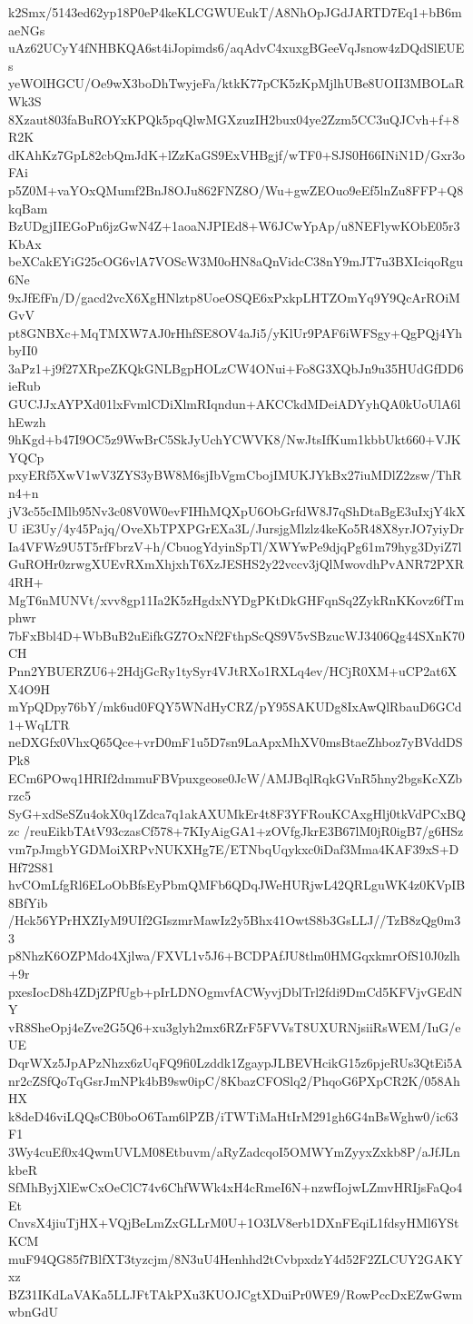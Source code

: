 k2Smx/5143ed62yp18P0eP4keKLCGWUEukT/A8NhOpJGdJARTD7Eq1+bB6maeNGs
uAz62UCyY4fNHBKQA6st4iJopimds6/aqAdvC4xuxgBGeeVqJsnow4zDQdSlEUEs
yeWOlHGCU/Oe9wX3boDhTwyjeFa/ktkK77pCK5zKpMjlhUBe8UOII3MBOLaRWk3S
8Xzaut803faBuROYxKPQk5pqQlwMGXzuzIH2bux04ye2Zzm5CC3uQJCvh+f+8R2K
dKAhKz7GpL82cbQmJdK+lZzKaGS9ExVHBgjf/wTF0+SJS0H66INiN1D/Gxr3oFAi
p5Z0M+vaYOxQMumf2BnJ8OJu862FNZ8O/Wu+gwZEOuo9eEf5lnZu8FFP+Q8kqBam
BzUDgjIIEGoPn6jzGwN4Z+1aoaNJPIEd8+W6JCwYpAp/u8NEFlywKObE05r3KbAx
beXCakEYiG25cOG6vlA7VOScW3M0oHN8aQnVidcC38nY9mJT7u3BXIciqoRgu6Ne
9xJfEfFn/D/gacd2vcX6XgHNlztp8UoeOSQE6xPxkpLHTZOmYq9Y9QcArROiMGvV
pt8GNBXc+MqTMXW7AJ0rHhfSE8OV4aJi5/yKlUr9PAF6iWFSgy+QgPQj4YhbyII0
3aPz1+j9f27XRpeZKQkGNLBgpHOLzCW4ONui+Fo8G3XQbJn9u35HUdGfDD6ieRub
GUCJJxAYPXd01lxFvmlCDiXlmRIqndun+AKCCkdMDeiADYyhQA0kUoUlA6lhEwzh
9hKgd+b47I9OC5z9WwBrC5SkJyUchYCWVK8/NwJtsIfKum1kbbUkt660+VJKYQCp
pxyERf5XwV1wV3ZYS3yBW8M6sjIbVgmCbojIMUKJYkBx27iuMDlZ2zsw/ThRn4+n
jV3c55cIMlb95Nv3c08V0W0evFIHhMQXpU6ObGrfdW8J7qShDtaBgE3uIxjY4kXU
iE3Uy/4y45Pajq/OveXbTPXPGrEXa3L/JursjgMlzlz4keKo5R48X8yrJO7yiyDr
Ia4VFWz9U5T5rfFbrzV+h/CbuogYdyinSpTl/XWYwPe9djqPg61m79hyg3DyiZ7l
GuROHr0zrwgXUEvRXmXhjxhT6XzJESHS2y22vccv3jQlMwovdhPvANR72PXR4RH+
MgT6nMUNVt/xvv8gp11Ia2K5zHgdxNYDgPKtDkGHFqnSq2ZykRnKKovz6fTmphwr
7bFxBbl4D+WbBuB2uEifkGZ7OxNf2FthpScQS9V5vSBzucWJ3406Qg44SXnK70CH
Pnn2YBUERZU6+2HdjGcRy1tySyr4VJtRXo1RXLq4ev/HCjR0XM+uCP2at6XX4O9H
mYpQDpy76bY/mk6ud0FQY5WNdHyCRZ/pY95SAKUDg8IxAwQlRbauD6GCd1+WqLTR
neDXGfx0VhxQ65Qce+vrD0mF1u5D7sn9LaApxMhXV0msBtaeZhboz7yBVddDSPk8
ECm6POwq1HRIf2dmmuFBVpuxgeose0JcW/AMJBqlRqkGVnR5hny2bgsKcXZbrzc5
SyG+xdSeSZu4okX0q1Zdca7q1akAXUMkEr4t8F3YFRouKCAxgHlj0tkVdPCxBQzc
/reuEikbTAtV93czasCf578+7KIyAigGA1+zOVfgJkrE3B67lM0jR0igB7/g6HSz
vm7pJmgbYGDMoiXRPvNUKXHg7E/ETNbqUqykxc0iDaf3Mma4KAF39xS+DHf72S81
hvCOmLfgRl6ELoObBfsEyPbmQMFb6QDqJWeHURjwL42QRLguWK4z0KVpIB8BfYib
/Hck56YPrHXZIyM9UIf2GIszmrMawIz2y5Bhx41OwtS8b3GsLLJ//TzB8zQg0m33
p8NhzK6OZPMdo4Xjlwa/FXVL1v5J6+BCDPAfJU8tlm0HMGqxkmrOfS10J0zlh+9r
pxesIocD8h4ZDjZPfUgb+pIrLDNOgmvfACWyvjDblTrl2fdi9DmCd5KFVjvGEdNY
vR8SheOpj4eZve2G5Q6+xu3glyh2mx6RZrF5FVVsT8UXURNjsiiRsWEM/IuG/eUE
DqrWXz5JpAPzNhzx6zUqFQ9fi0Lzddk1ZgaypJLBEVHcikG15z6pjeRUs3QtEi5A
nr2cZSfQoTqGsrJmNPk4bB9sw0ipC/8KbazCFOSlq2/PhqoG6PXpCR2K/058AhHX
k8deD46viLQQsCB0boO6Tam6lPZB/iTWTiMaHtIrM291gh6G4nBsWghw0/ic63F1
3Wy4cuEf0x4QwmUVLM08Etbuvm/aRyZadcqoI5OMWYmZyyxZxkb8P/aJfJLnkbeR
SfMhByjXlEwCxOeClC74v6ChfWWk4xH4cRmeI6N+nzwfIojwLZmvHRIjsFaQo4Et
CnvsX4jiuTjHX+VQjBeLmZxGLLrM0U+1O3LV8erb1DXnFEqiL1fdsyHMl6YStKCM
muF94QG85f7BlfXT3tyzcjm/8N3uU4Henhhd2tCvbpxdzY4d52F2ZLCUY2GAKYxz
BZ31IKdLaVAKa5LLJFtTAkPXu3KUOJCgtXDuiPr0WE9/RowPccDxEZwGwmwbnGdU
